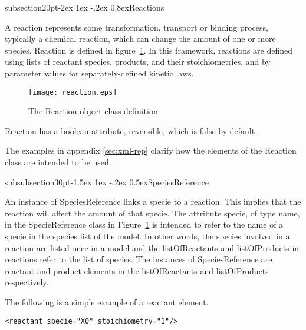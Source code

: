 \documentclass[10pt]{article}
\makeatletter
\renewcommand{\subsection}{\@startsection%
  {subsection}{2}{0pt}{-2ex \@plus 1ex \@minus -.2ex}%
  {0.8ex}{\slshape\large\bfseries}}
\renewcommand{\subsubsection}{\@startsection%
  {subsubsection}{3}{0pt}{-1.5ex \@plus 1ex \@minus -.2ex}%
  {0.5ex}{\slshape\normalsize\bfseries}}
\newcommand{\tightspacing}{\renewcommand{\baselinestretch}{0.85}}
\newcommand{\regularspacing}{\renewcommand{\baselinestretch}{1.0}}
\newcommand{\class}[1]{\textsf{#1}}
\newcommand{\attrib}[1]{\textsf{#1}}
\makeatother
\begin{document}
\subsection{Reactions}

A \class{reaction} represents some transformation, transport or
binding process, typically a chemical reaction, which can change
the amount of one or more species.  \class{Reaction} is defined
in figure~\ref{fig:reaction}.  In this framework, reactions are
defined using lists of reactant species, products, and their
stoichiometries, and by parameter values for separately-defined
kinetic laws.

\begin{figure}[h]
  \centering
  \texttt{[image: reaction.eps]}
  \caption{The \class{Reaction} object class definition.}
  \label{fig:reaction}
\end{figure}

\class{Reaction} has a boolean attribute, \attrib{reversible},
which is false by default.

The examples in appendix \ref{sec:xml-rep} clarify how the
elements of the \class{Reaction} class are intended to be used.

\subsubsection{SpeciesReference}

An instance of \class{SpeciesReference} links a specie to a
\class{reaction}. This implies that the reaction will affect the
amount of that specie. The attribute \attrib{specie},
of type name, in the \class{SpecieReference} class in
Figure~\ref{fig:reaction} is intended to refer to the name of a
specie in the species list of the model.  In other words, the
species involved in a reaction are listed once in a model and the
\attrib{listOfReactants} and \attrib{listOfProducts} in reactions
refer to the list of species.  The instances of \class{SpeciesReference}
are \class{reactant} and \class{product} elements in the
\attrib{listOfReactants} and \attrib{listOfProducts} respectively.

The following is a simple example of a \class{reactant} element.
\begin{small}
\tightspacing
\begin{verbatim}
<reactant specie="X0" stoichiometry="1"/>
\end{verbatim}
\regularspacing
\end{small}
\end{document}
